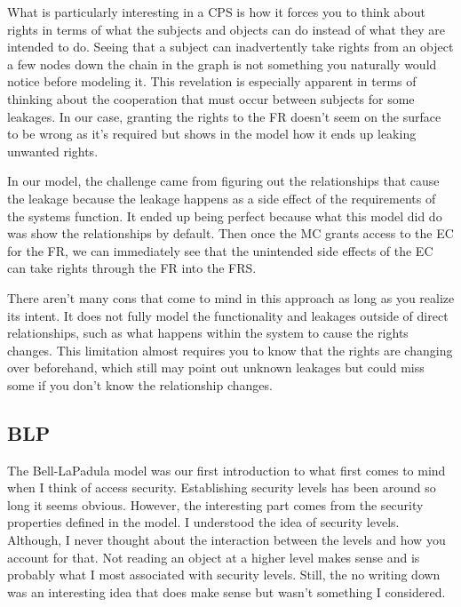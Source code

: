 \documentclass[10pt,journal,compsoc]{IEEEtran}
\begin{document}
What is particularly interesting in a CPS is how it forces you to think about rights in terms of what the subjects and objects can do instead of what they are intended to do. Seeing that a subject can inadvertently take rights from an object a few nodes down the chain in the graph is not something you naturally would notice before modeling it. This revelation is especially apparent in terms of thinking about the cooperation that must occur between subjects for some leakages. In our case, granting the rights to the FR doesn't seem on the surface to be wrong as it's required but shows in the model how it ends up leaking unwanted rights. 

In our model, the challenge came from figuring out the relationships that cause the leakage because the leakage happens as a side effect of the requirements of the systems function. It ended up being perfect because what this model did do was show the relationships by default. Then once the MC grants access to the EC for the FR, we can immediately see that the unintended side effects of the EC can take rights through the FR into the FRS. 

There aren't many cons that come to mind in this approach as long as you realize its intent. It does not fully model the functionality and leakages outside of direct relationships, such as what happens within the system to cause the rights changes. This limitation almost requires you to know that the rights are changing over beforehand, which still may point out unknown leakages but could miss some if you don't know the relationship changes. 

\subsection{BLP}

The Bell-LaPadula model was our first introduction to what first comes to mind when I think of access security. Establishing security levels has been around so long it seems obvious. However, the interesting part comes from the security properties defined in the model. I understood the idea of security levels. Although, I never thought about the interaction between the levels and how you account for that. Not reading an object at a higher level makes sense and is probably what I most associated with security levels. Still, the no writing down was an interesting idea that does make sense but wasn't something I considered. 
\end{document}
